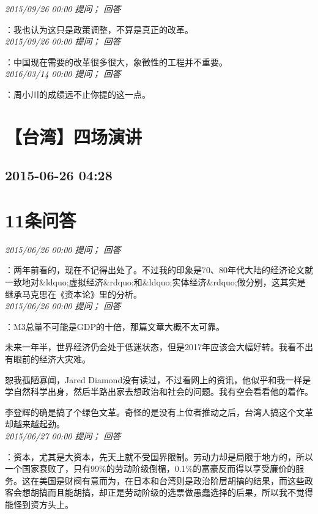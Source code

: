 \documentclass[twocolumn]{ctexart}
\begin{document}
\textit{\hfill\noindent\small 2015/09/26 00:00 提问； 回答}

：我也认为这只是政策调整，不算是真正的改革。\\

\textit{\hfill\noindent\small 2015/09/26 00:00 提问； 回答}

：中国现在需要的改革很多很大，象徵性的工程并不重要。\\

\textit{\hfill\noindent\small 2016/03/14 00:00 提问； 回答}

：周小川的成绩远不止你提的这一点。\\


\section{【台湾】四场演讲}
\subsection{2015-06-26 04:28}


\section{11条问答}

\textit{\hfill\noindent\small 2015/06/26 00:00 提问； 回答}

：两年前看的，现在不记得出处了。不过我的印象是70、80年代大陆的经济论文就一致地对\&ldquo;虚拟经济\&rdquo;和\&ldquo;实体经济\&rdquo;做分别，这其实是继承马克思在《资本论》里的分析。\\

\textit{\hfill\noindent\small 2015/06/26 00:00 提问； 回答}

：M3总量不可能是GDP的十倍，那篇文章大概不太可靠。

未来一年半，世界经济仍会处于低迷状态，但是2017年应该会大幅好转。我看不出有眼前的经济大灾难。

恕我孤陋寡闻，Jared Diamond没有读过，不过看网上的资讯，他似乎和我一样是学自然科学出身，然后半路出家去想政治和社会的问题。我有空会看看他的着作。

李登辉的确是搞了个绿色文革。奇怪的是没有上位者推动之后，台湾人搞这个文革却越来越起劲。\\

\textit{\hfill\noindent\small 2015/06/27 00:00 提问； 回答}

：资本，尤其是大资本，先天上就不受国界限制。劳动力却是局限于地方的，所以一个国家衰败了，只有99\%的劳动阶级倒楣，0.1\%的富豪反而得以享受廉价的服务。这在美国是财阀有意而为，在日本和台湾则是政治阶层胡搞的结果，而这些政客会想胡搞而且能胡搞，却正是劳动阶级的选票做愚蠢选择的后果，所以我不觉得能怪到资方头上。
\end{document}
